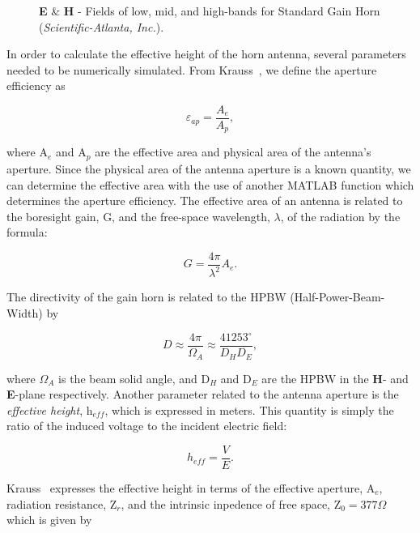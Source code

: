 \begin{figure}[htbp]
\centering
\epsfxsize=4.0in
\caption{\textbf{E} \& \textbf{H} - Fields of low, mid, and high-bands for Standard Gain Horn (\textit{Scientific-Atlanta, Inc.}).}
\label{fig:fieldPattern}
\end{figure}

\par In order to calculate the effective height of the horn antenna, several parameters needed to be numerically simulated.  From Krauss~\cite{}, we define the aperture efficiency as

\begin{equation}
\varepsilon_{ap} = \frac{A_{e}}{A_{p}},
\end{equation}

\noindent where A$_{e}$ and A$_{p}$ are the effective area and physical area of the antenna's aperture.  Since the physical area of the antenna aperture is a known quantity, we can determine the effective area with the use of another MATLAB function which determines the aperture efficiency.  The effective area of an antenna is related to the boresight gain, G, and the free-space wavelength, $\lambda$, of the radiation by the formula:

\begin{equation}
G = \frac{4\pi}{\lambda^{2}}A_{e}.
\end{equation}

\par The directivity of the gain horn is related to the HPBW (Half-Power-Beam-Width) by

\begin{equation}
D \approx \frac{4\pi}{\Omega_{A}} \approx \frac{41253^{\circ}}{D_{H}D_{E}},
\end{equation}

\noindent where $\Omega_{A}$ is the beam solid angle, and D$_{H}$ and D$_{E}$ are the HPBW in the \textbf{H}- and \textbf{E}-plane respectively.  Another parameter related to the antenna aperture is the \emph{effective height}, h$_{eff}$, which is expressed in meters.  This quantity is simply the ratio of the induced voltage to the incident electric field:

\begin{equation}
h_{eff} = \frac{V}{E}.
\end{equation}

\noindent Krauss~\cite{} expresses the effective height in terms of the effective aperture, A$_{e}$, radiation resistance, Z$_r$, and the intrinsic inpedence of free space, Z$_0 = 377 \Omega$ which is given by

